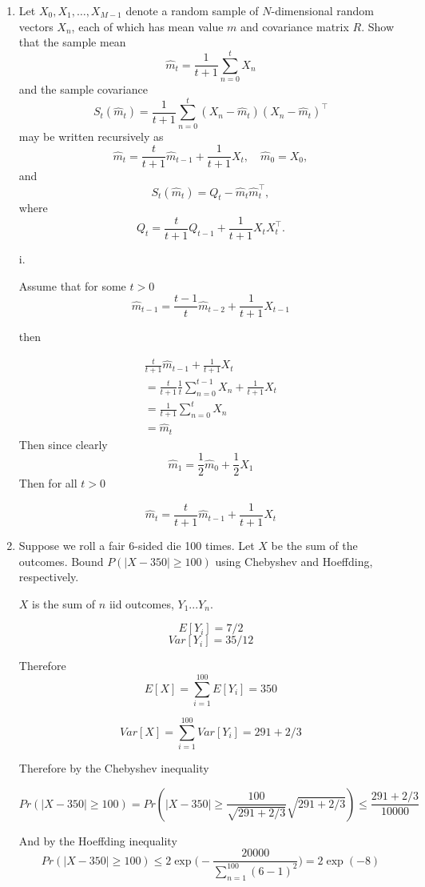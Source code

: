 \documentclass{article}
\begin{document}
\begin{enumerate}

\item
Let $X_0, X_1, \ldots, X_{M-1}$ denote a random sample of $N$-dimensional random vectors $X_n$, each of which has mean value $m$ and covariance matrix $R$.  Show that the sample mean
$$\hat m_t = \frac{1}{t+1} \sum_{n=0}^t  X_n$$
and the sample covariance 
$$S_t(\hat m_t) = \frac{1}{t+1} \sum_{n=0}^t (X_n - \hat m_t)(X_n - \hat m_t)^\top$$
may be written recursively as
$$\hat m_t = \frac{t}{t+1} \hat m_{t-1} + \frac{1}{t+1} X_t, \quad \hat m_0 = X_0,$$
and
$$S_t(\hat m_t) = Q_t - \hat m_t \hat m_t^\top,$$
where
$$ Q_t  = \frac{t}{t+1} Q_{t-1} + \frac{1}{t+1} X_t X_t^\top.$$

\color{blue}
i.

Assume that for some $t>0$ 
$$
\hat{m}_{t-1} = \frac{t-1}{t} \hat m_{t-2} + \frac{1}{t+1}X_{t-1}
$$

then 

\begin{align*}
\frac{t}{t+1} \hat m_{t-1} + \frac{1}{t+1}X_t\\
= \frac{t}{t+1} \frac{1}{t} \sum_{n=0}^{t-1} X_n + \frac{1}{t+1}X_t\\
= \frac{1}{t+1} \sum_{n=0}^t  X_n \\
=\hat m_t
\end{align*}
Then since clearly
\[
\hat m_1 = \frac{1}{2} \hat m_0 + \frac{1}{2} X_1
\]
Then for all $t>0$

$$\hat m_t = \frac{t}{t+1} \hat m_{t-1} + \frac{1}{t+1} X_t
$$

\color{black}


\item
Suppose we roll a fair 6-sided die 100 times. Let $X$ be the sum of the outcomes.  Bound $P(|X-350| \ge 100)$ using Chebyshev and Hoeffding, respectively.

\color{blue}

$X$ is the sum of $n$ iid outcomes, $Y_1 ... Y_n$.

\[
E[Y_i] = 7/2
\]
\[
Var[Y_i] = 35/12
\]

Therefore
$$E[X] = \sum_{i=1} ^{100} E[Y_i] = 350$$

$$Var[X] = \sum_{i=1} ^{100} Var[Y_i] =  291 + 2/3$$

Therefore by the Chebyshev inequality

\[
Pr(|X-350| \geq 100) = Pr(|X-350| \geq \frac{100}{\sqrt{291+2/3}}\sqrt{291+ 2/3}) \leq \frac{291+2/3}{10000}
\]

And by the Hoeffding inequality
$$Pr(|X-350| \geq 100) \leq 2 \exp \bigg( -\frac{20000}{\sum_{n=1}^{100}(6-1)^2} \bigg) = 2 \exp (-8)$$


\end{enumerate}
\end{document}

